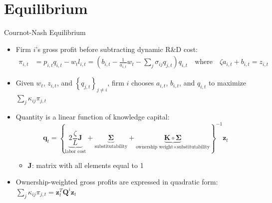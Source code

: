 \documentclass[
  aspectratio=169,  %
  handout           %
]{beamer}
\theoremstyle{plain}
\begin{document}
\section{Equilibrium}

\begin{frame}{Cournot-Nash Equilibrium}
  \begin{itemize}
    \item \label{cournot}Firm $i$'s gross profit before subtracting dynamic
          R\&D cost:
          \begin{align*}
            \pi_{i,t} & =p_{i,t}q_{i,t}-w_{t}l_{i,t}=\left(b_{i,t}-\frac{1}{a_{i,t}}w_{t}-\sum_{j}\sigma_{ij}q_{j,t}\right)q_{i,t}\quad\text{where}\quad\zeta a_{i,t}+b_{i,t}=z_{i,t}
          \end{align*}
    \item Given $w_{t}$, $z_{i,t}$, and $\left\{ q_{j,t}\right\} _{j\neq i}$,
          firm $i$ chooses $a_{i,t}$, $b_{i,t}$, and $q_{i,t}$ to maximize
          $\sum_{j}\kappa_{ij}\pi_{j,t}$\pause\medskip{}
    \item Quantity is a linear function of knowledge capital:
          \[
            \symbf{q}_{t}=\left\{ \underbrace{2\frac{\zeta}{L}\symbf{J}}_{\text{labor cost}}+\underbrace{\symbf{\Sigma}}_{\text{substitutability}}+\underbrace{\symbf{K}\circ\symbf{\Sigma}}_{\text{ownership weight}\times\text{substitutability}}\right\} ^{-1}\symbf{z}_{t}
          \]

          \begin{itemize}
            \item $\symbf{J}$: matrix with all elements equal to 1\medskip{}
          \end{itemize}
    \item Ownership-weighted gross profits are expressed in quadratic form:
          $\sum_{j}\kappa_{ij}\pi_{j,t}=\symbf{z}_{t}^{T}\symbf{Q}^{i}\symbf{z}_{t}$
          \hyperlink{Q}{}
  \end{itemize}
\end{frame}
%
\end{document}
